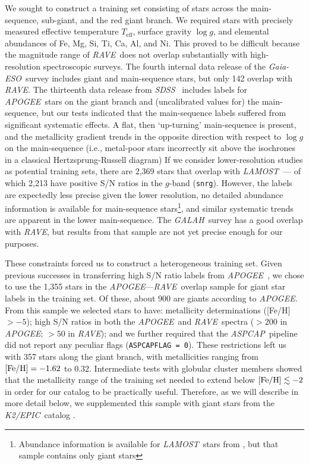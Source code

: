 \documentclass[preprint,trackchanges]{aastex}
\newcommand{\acronym}[1]{{\small{#1}}}
\newcommand{\project}[1]{\textsl{#1}}
\newcommand{\rave}{\project{\acronym{RAVE}}}
\newcommand{\galah}{\project{\acronym{GALAH}}}
\newcommand{\ges}{\project{Gaia-ESO}}
\newcommand{\apogee}{\project{\acronym{APOGEE}}}
\newcommand{\aspcap}{\project{\acronym{ASPCAP}}}
\newcommand{\lamost}{\project{\acronym{LAMOST}}}
\newcommand{\epic}{\project{K2/EPIC}}
\newcommand{\sdss}{\project{\acronym{SDSS}}}
\newcommand{\teff}{T_{\mathrm{eff}}}
\newcommand{\logg}{\log g}
\begin{document}
We sought to construct a training set consisting of stars across the main-sequence,
sub-giant, and the red giant branch.  We required stars with precisely measured
effective temperature $\teff$, surface gravity $\logg$, and elemental abundances
of Fe, Mg, Si, Ti, Ca, Al, and Ni.  This proved to be difficult because the magnitude
range of \rave\ does not overlap substantially with high-resolution spectroscopic
surveys.  The fourth internal data release of the \ges\ survey includes 
giant and main-sequence stars, but only 142 overlap with \rave.  The thirteenth data 
release from \sdss\ \citep{sloan_dr13} includes labels for \apogee\ stars on the
giant branch and (uncalibrated values for) the main-sequence, but our tests indicated
that the main-sequence labels suffered from significant systematic effects.  A flat, 
then `up-turning' main-sequence is present, and the metallicity gradient trends in 
the opposite direction with respect to $\logg$ on the main-sequence (i.e., metal-poor
stars incorrectly sit above the isochrones in a classical Hertzsprung-Russell diagram)
If we consider lower-resolution studies as potential training sets, there are 2,369
stars that overlap with \lamost\ --- of which 2,213 have positive S/N ratios in the 
$g$-band (\texttt{snrg}).  However, the labels are expectedly less precise given the
lower resolution, no detailed abundance information is available for main-sequence 
stars\footnote{Abundance information is available for \lamost\ stars from \citet{Ho_2016},
but that sample contains only giant stars}, and similar systematic trends are apparent
in the lower main-sequence.  The \galah\ survey has a good overlap with \rave, but 
results from that sample are not yet precise enough for our purposes.


These constraints forced us to construct a heterogeneous training set.  Given previous
successes in transferring high S/N ratio labels from \apogee\ \citep{Ness_2015,
Ness_2016,Ho_2016,Casey_2016b}, we chose to use the 1,355 stars in the \apogee---\rave\ 
overlap sample for giant star labels in the training set.  Of these, about 900 are 
giants according to \apogee.  From this sample we selected stars to have: metallicity
determinations ([Fe/H] $> -5$); high S/N ratios in both the \apogee\ and \rave\ spectra
($>200$ in \apogee; $>50$ in \rave); and we further required that the \aspcap\ pipeline 
did not report any peculiar flags (\texttt{ASPCAPFLAG = 0}).  These restrictions left 
us with 357 stars along the giant branch, with metallicities ranging from 
$[{\rm Fe/H}] = -1.62$ to 0.32.  Intermediate tests with globular cluster members showed
that the metallicity range of the training set needed to extend below 
$[{\rm Fe/H}] \lesssim -2$ in order for our catalog to be practically useful.
Therefore, as we will describe in more detail below, we supplemented this sample with 
giant stars from the \epic\ catalog \citep{Huber_2016}.
\end{document}
